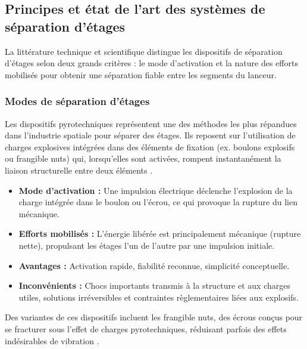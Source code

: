 \subsection{Principes et état de l’art des systèmes de séparation d’étages}
\label{sec:etat_art_separation}

La littérature technique et scientifique distingue les dispositifs de séparation d’étages selon deux grands critères : le mode
d’activation et la nature des efforts mobilisés pour obtenir une séparation fiable entre les segments du lanceur.

\subsubsection{Modes de séparation d’étages}


Les dispositifs pyrotechniques représentent une des méthodes les plus répandues dans l’industrie spatiale pour séparer des
étages. Ils reposent sur l’utilisation de charges explosives intégrées dans des éléments de fixation (ex. boulons explosifs ou
frangible nuts) qui, lorsqu’elles sont activées, rompent instantanément la liaison structurelle entre deux éléments
\cite{Pyrotechnic_StageSeparation}\cite{Pyrotechnic_Fastener}.\\

\begin{itemize}
    \item \textbf{Mode d’activation :} Une impulsion électrique déclenche l’explosion de la charge intégrée dans le boulon ou
    l’écrou, ce qui provoque la rupture du lien mécanique.
    \item \textbf{Efforts mobilisés :} L’énergie libérée est principalement mécanique (rupture nette), propulsant les étages l’un
    de l’autre par une impulsion initiale.
    \item \textbf{Avantages :} Activation rapide, fiabilité reconnue, simplicité conceptuelle.
    \item \textbf{Inconvénients :} Chocs importants transmis à la structure et aux charges utiles, solutions irréversibles et
    contraintes règlementaires liées aux explosifs.\\
\end{itemize}

Des variantes de ces dispositifs incluent les frangible nuts, des écrous conçus pour se fracturer sous l’effet de charges
pyrotechniques, réduisant parfois des effets indésirables de vibration \cite{Frangible_Nut}.

